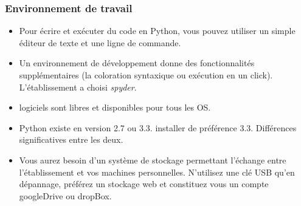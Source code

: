 \begin{frame}
\frametitle{Environnement de travail}
\begin{itemize}
  \item Pour écrire et exécuter du code en Python, vous pouvez utiliser un simple éditeur de texte et une ligne de commande. 
  \item Un environnement de développement donne des fonctionnalités supplémentaires (la coloration syntaxique ou exécution en un click). L'établissement a choisi \emph{spyder}.
  \item logiciels sont libres et disponibles pour tous les OS.
  \item Python existe en version 2.7 ou 3.3. installer de préférence 3.3. Différences significatives entre les deux.
  \item Vous aurez besoin d'un système de stockage permettant l'échange entre l'établissement et vos machines personnelles. N'utilisez une clé USB qu'en dépannage, préférez un stockage web et constituez vous un compte googleDrive ou dropBox. 
\end{itemize}
\end{frame}




